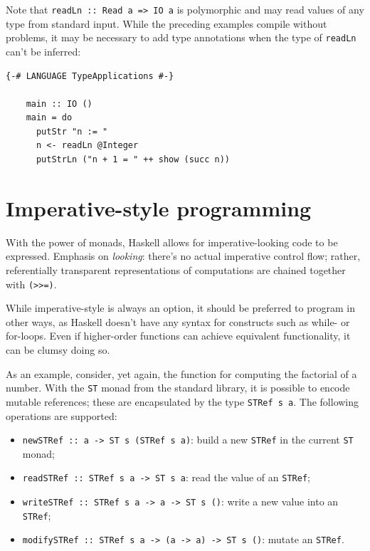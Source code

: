 \documentclass[UdineBachThesis,american,11pt]{PhdThesis}
\begin{document}
  Note that \mbox{\texttt{readLn :: Read a => IO a}} is polymorphic and may read
  values of any type from standard input. While the preceding examples compile
  without problems, it may be necessary to add type annotations when the type of
  \mbox{\texttt{readLn}} can't be inferred:

  \begin{Verbatim}[gobble=4,fontsize=\small]
    {-# LANGUAGE TypeApplications #-}

    main :: IO ()
    main = do
      putStr "n := "
      n <- readLn @Integer
      putStrLn ("n + 1 = " ++ show (succ n))
  \end{Verbatim}

  \section{Imperative-style programming}

  With the power of monads, Haskell allows for imperative-looking code to be
  expressed. Emphasis on \emph{looking}: there's no actual imperative control
  flow; rather, referentially transparent representations of computations are
  chained together with \mbox{\texttt{(>>=)}}.

  While imperative-style is always an option, it should be preferred to program
  in other ways, as Haskell doesn't have any syntax for constructs such as
  while- or for-loops. Even if higher-order functions can achieve equivalent
  functionality, it can be clumsy doing so.

  As an example, consider, yet again, the function for computing the factorial
  of a number. With the \mbox{\texttt{ST}} monad from the standard library, it
  is possible to encode mutable references; these are encapsulated by the type
  \mbox{\texttt{STRef s a}}. The following operations are supported:

  \begin{itemize}
    \item \mbox{\texttt{newSTRef :: a -> ST s (STRef s a)}}: build a new
    \mbox{\texttt{STRef}} in the current \mbox{\texttt{ST}} monad;

    \item \mbox{\texttt{readSTRef :: STRef s a -> ST s a}}: read the value of an
    \mbox{\texttt{STRef}};

    \item \mbox{\texttt{writeSTRef :: STRef s a -> a -> ST s ()}}: write a new
    value into an \mbox{\texttt{STRef}};

    \item \mbox{\texttt{modifySTRef :: STRef s a -> (a -> a) -> ST s ()}}:
    mutate an \mbox{\texttt{STRef}}.
  \end{itemize}
\end{document}
